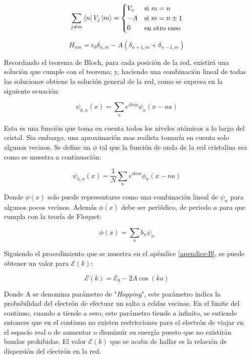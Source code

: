 \begin{equation}\label{eq:5.12}
\sum_{j \neq m}\bra{n}V_j\ket{m}=
    \begin{cases}
    V_o & \text{si $m=n$}\\
    -A & \text{si $m=n\pm 1 $} \\
    0 & \text{en otro caso}
    \end{cases}
\end{equation}

\begin{equation}\label{eq:5.13}
    H_{nm}=\epsilon_{0}\delta_{n,m}-A(\delta_{n+1,m}+\delta_{n-1,m})
\end{equation}

Recordando el teorema de Bloch, para cada posición de la red, existirá una solución que cumple con el teorema; y, haciendo una combinación lineal de todas las soluciones obtiene la solución general de la red, como se expresa en la siguiente ecuación:

\begin{equation}\label{eq:5.14}
    \psi_{k,n}(x)=\sum_n e^{ikna}\psi_n(x-na)
\end{equation}

Esta es una función que toma en cuenta todos los niveles atómicos a lo largo del cristal. Sin embargo, una aproximación mas realista tomaría en cuenta solo algunos vecinos. Se define un $\phi$ tal que la función de onda de la red cristalina sea como se muestra a continuación: 

\begin{equation}\label{eq:5.15}
    \psi_{k,n}(x)=\frac{1}{N}\sum_n e^{ikna}\phi_n(x-na)
\end{equation}

Donde $\phi(x)$ solo puede representarse como una combinación lineal de $\psi_n$ para algunos pocos vecinos. Además $\phi(x)$ debe ser periódico, de periodo $a$ para que cumpla con la teoría de Floquet: 

\begin{equation}\label{eq:5.16}
    \phi(x)=\sum_n b_n\psi_n
\end{equation}

Siguiendo el procedimiento que se muestra en el apéndice \ref{apendice:B}, se puede obtener un valor para $\mathcal{E}(k)$:

\begin{equation}\label{eq:5.17}
    \mathcal{E}(k)=\mathcal{E}_0-2A\cos(ka)
\end{equation}

Donde A se denomina parámetro de "\textit{Hopping}", este parámetro indica la probabilidad del electrón de efectuar un salto a celdas vecinas. En el limite del continuo, cuando $a$ tiende a cero, este parámetro tiende a infinito, se entiende entonces que en el continuo no existen restricciones para el electrón de viajar en el espacio real o de aumentar o disminuir su energía puesto que no existirán bandas prohibidas. El valor $\mathcal{E}(k)$ que se acaba de hallar es la relación de dispersión del electrón en la red.